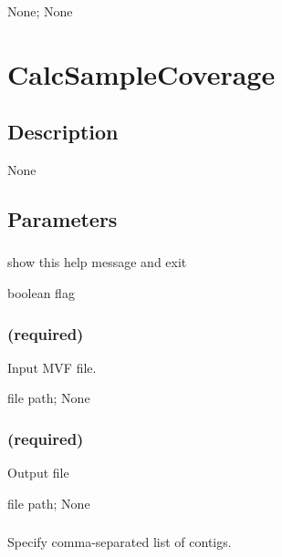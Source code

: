 \documentclass[letterpaper,11pt,english]{sphinxmanual}
\begin{document}
 None;  None


\section{CalcSampleCoverage}
\label{\detokenize{prog_desc:calcsamplecoverage}}

\subsection{Description}
\label{\detokenize{prog_desc:id76}}
None


\subsection{Parameters}
\label{\detokenize{prog_desc:id77}}

\subsubsection{}
\label{\detokenize{prog_desc:id78}}
 show this help message and exit

 boolean flag


\subsubsection{ (required)}
\label{\detokenize{prog_desc:id79}}
 Input MVF file.

 file path;  None


\subsubsection{ (required)}
\label{\detokenize{prog_desc:id80}}
 Output file

 file path;  None


\subsubsection{}
\label{\detokenize{prog_desc:id81}}
 Specify comma-separated list of contigs.
\end{document}
